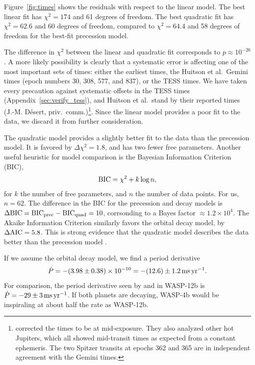 \documentclass[12pt,twocolumn,tighten]{aastex62}
\begin{document}
Figure~\ref{fig:times} shows the residuals with respect to the linear
model.  The best linear fit has $\chi^2 = 174$ and 61 degrees of
freedom.  The best quadratic fit has $\chi^2 = 62.6$ and 60
degrees of freedom, compared to $\chi^2 = 64.4$
and 58 degrees of freedom for the best-fit precession model.

The difference in $\chi^2$ between the linear and quadratic fit
corresponds to $p \approx 10^{-26}$.  A more likely possibility is
clearly that a systematic error is affecting one of the most important
sets of times: either the earliest times, the Huitson et al.\ Gemini
times (epoch numbers 30, 308, 577, and 837), or the TESS times.  We
have taken every precaution against systematic offsets in the TESS
times (Appendix~\ref{sec:verify_tess}), and Huitson et al.\ stand by
their reported times (J.-M. D\'esert, priv.\
comm.)\footnote{\citet{huitson_gemini_2017} corrected the times to be
at mid-exposure. They also analyzed other hot Jupiters, which all
showed mid-transit times as expected from a constant ephemeris.
The two Spitzer transits at epochs 362 and 365 are in independent
agreement with the Gemini times.}.
Since the linear model provides a poor fit to the data, we discard it
from further consideration.

The quadratic model provides a slightly better fit to the data than the
precession model.  It is favored by $\Delta \chi^2 = 1.8$, and has two
fewer free parameters.  Another useful heuristic for model comparison
is the Bayesian Information Criterion (BIC),
\begin{equation}
  {\rm BIC} = \chi^2 + k\log n,
\end{equation}
for $k$ the number of free parameters, and $n$ the number of data
points. For us, $n=62$.  The difference in the BIC for the precession
and decay models is $\Delta {\rm BIC} = {\rm BIC}_{\rm prec} - {\rm
BIC}_{\rm quad} = 10$, corrsonding to a Bayes factor $\approx
1.2\times10^{4}$.  The Akaike Information Criterion similarly favors
the orbital decay model, by $\Delta {\rm AIC} = 5.8$.  This is strong
evidence that the quadratic model describes the data better than the
precession model \citep{kass_bayes_1995}.

If we assume the orbital decay model, we find a period derivative 
\begin{equation}
\dot{P}
  = - (3.98 \pm 0.38)\times 10^{-10}
  = - (12.6) \pm 1.2\,{\rm ms}\,{\rm yr}^{-1}.
  \label{eq:dP_dt_obs}
\end{equation}
For comparison, the period derivative seen by
\citet{maciejewski_departure_2016} and \citet{patra_2017} in WASP-12b
is $\dot{P} = -29 \pm 3\,{\rm ms}\,{\rm yr}^{-1}$.  If both planets
are decaying, WASP-4b would be inspiraling at about half the rate as
WASP-12b.
\end{document}
